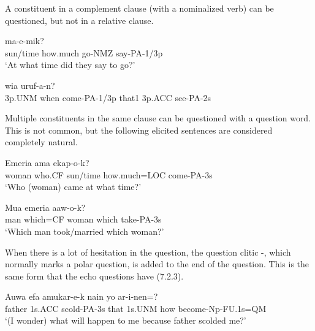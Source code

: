 A constituent in a complement clause (with a nominalized verb) can be questioned, but not in a relative clause. 

\ea%
\label{ex:x1175}
\gll {}      ma-e-mik? \\
sun/time  how.much  go-NMZ  say-PA-1/3p      \\
\glt `At what time did they say to go?'
\z





\ea%
\label{ex:x1176}
\gll {}        wia  uruf-a-n? \\
3p.UNM  when  come-PA-1/3p  that1  3p.ACC  see-PA-2s \\
\glt
\z



Multiple constituents in the same clause can be questioned with a question word. This is not common, but the following elicited sentences are considered completely natural. 

\ea%
\label{ex:x1177}
\gll Emeria   ama    ekap-o-k? \\
woman  who.CF  sun/time  how.much=LOC  come-PA-3s      \\
\glt `Who (woman) came at what time?'
\z





\ea%
\label{ex:x1178}
\gll Mua    emeria    aaw-o-k? \\
man  which=CF  woman  which  take-PA-3s      \\
\glt `Which man took/married which woman?'
\z





When there is a lot of hesitation in the question, the question clitic -, which normally marks a polar question, is added to the end of the question. This is the same form that the echo questions have (7.2.3). 

\ea%
\label{ex:x1187}
\gll Auwa  efa  amukar-e-k  nain  yo   ar-i-nen=?\\
father  1s.ACC  scold-PA-3s  that  1s.UNM  how   become-Np-FU.1s=QM   \\
\glt `(I wonder) what will happen to me because father scolded me?'	
\z


